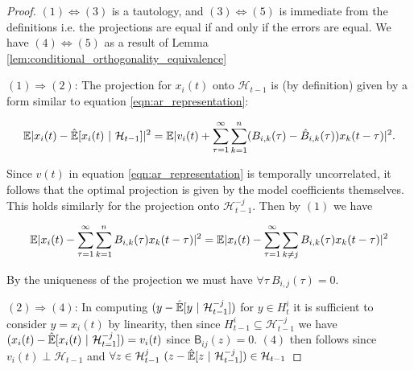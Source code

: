 \documentclass[12pt]{article}
\def\B{\mathsf{B}}  %
\def\H{\mathcal{H}}  %
\newcommand{\linE}[2]{\hat{\E}[#1\ |\ #2]}  %
\begin{document}
\begin{proof}

  $(1) \iff (3)$ is a tautology, and $(3) \iff (5)$ is immediate from the
  definitions i.e. the projections are equal if and only if the errors
  are equal.  We have $(4) \iff (5)$ as a result of Lemma
  \ref{lem:conditional_orthogonality_equivalence}


  $(1) \Rightarrow (2)$: The projection for $x_i(t)$ onto $\H_{t - 1}$ is
  (by definition) given by a form similar to equation
  \ref{eqn:ar_representation}:

\[
  \E|x_i(t) - \linE{x_i(t)}{\H_{t - 1}}|^2 = \E|v_i(t) + \sum_{\tau = 1}^\infty \sum_{k = 1}^n (B_{i, k}(\tau) - \hat{B}_{i, k}(\tau))x_k(t - \tau)|^2.
\]

Since $v(t)$ in equation \ref{eqn:ar_representation} is temporally
uncorrelated, it follows that the optimal projection is given by the
model coefficients themselves.  This holds similarly for the
projection onto $\H_{t - 1}^{-j}$.  Then by $(1)$ we have

\[
  \mathbb{E}|x_i(t) - \sum_{\tau = 1}^\infty \sum_{k = 1}^n B_{i, k}(\tau)x_k(t - \tau)|^2 = \mathbb{E}|x_i(t) - \sum_{\tau = 1}^\infty\sum_{k \ne j}B_{i, k}(\tau)x_k(t - \tau)|^2
\]

By the uniqueness of the projection we must have
$\forall \tau\ B_{i, j}(\tau) = 0$.

$(2) \Rightarrow (4)$: In computing $(y - \linE{y}{\H_{t - 1}^{-j}})$ for
$y \in H_t^i$ it is sufficient to consider $y = x_i(t)$ by linearity, then since
$H_{t - 1}^i \subseteq \H_{t - 1}^{-j}$ we have
$(x_i(t) - \linE{x_i(t)}{\H_{t = 1}^{-j}}) = v_i(t)$ since $\B_{ij}(z) = 0$.  $(4)$ then follows
since $v_i(t) \perp \H_{t - 1}$ and
$\forall z \in \H_{t - 1}^j\ (z - \linE{z}{\H_{t - 1}^{-j}}) \in \H_{t
  - 1}$
\end{proof}


\end{document}

